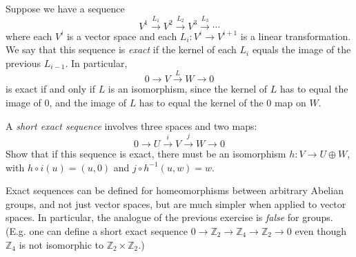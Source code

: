 \documentclass[12pt]{amsbook}
\newcommand{\Z}{{\mathbb Z}}
\theoremstyle{definition}
\begin{document}
Suppose we have a sequence 
$$ V^1 \xrightarrow {L_1} V^2 \xrightarrow {L_2} V^3 \xrightarrow {L_3} \cdots$$
where each $V^i$ is a vector space and each $L_i: V^i \to V^{i+1}$ is a linear
transformation. We say that this sequence is {\em exact} if the kernel of 
each $L_i$ equals the image of the previous $L_{i-1}$. In particular, 
$$ 0 \xrightarrow {} V \xrightarrow L W \xrightarrow {} 0 $$
is exact if and only if $L$ is an isomorphism, since the kernel of $L$
has to equal the image of 0, and the image of $L$ has to equal the kernel
of the 0 map on $W$. 

\smallskip

 A {\em short exact sequence} involves three spaces 
and two maps:
$$ 0 \rightarrow U \xrightarrow i V \xrightarrow j W \rightarrow 0 $$
Show that if this sequence is exact, there must be an isomorphism $h:V 
\to U \oplus W$, with $h\circ i(u)=(u,0)$
and $j\circ h^{-1}(u,w)=w$. 

\smallskip

Exact sequences can be defined for homeomorphisms between arbitrary 
Abelian groups, and not just vector spaces, but are much simpler when 
applied to vector spaces. In particular, the analogue of the previous exercise
is {\em false} for groups. (E.g. one can define a short exact sequence 
$0 \to \Z_2 \to \Z_4 \to \Z_2 \to 0$ even though $\Z_4$ is not isomorphic to 
$\Z_2 \times \Z_2$.)
\end{document}
